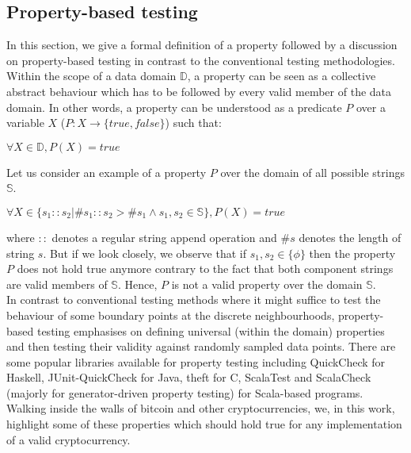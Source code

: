 
\newcommand{\avector}[2]{(#1_1,#1_2,\ldots,#1_{#2})}
\newcommand{\aDEFvector}[2][a]{(#1_1,#1_2,\ldots,#1_{#2})}

\subsection{Property-based testing}
In this section, we give a formal definition of a property followed by a discussion on property-based testing in contrast to the conventional testing methodologies.\\
Within the scope of a data domain $\mathbb{D}$, a property can be seen as a collective abstract behaviour which has to be followed by every valid member of the data domain. In other words, a property can be understood as a predicate $P$ over a variable $X$ ($P:X \rightarrow \{true, false\}$) such that: 
\begin{center}
$\forall X \in \mathbb{D}, P(X) = true$
\end{center}
Let us consider an example of a property $P$ over the domain of all possible strings $\mathbb{S}$.
\begin{center}
$\forall X \in \{s_1::s_2 | \#s_1::s_2 >  \#s_1 \wedge s_1, s_2 \in \mathbb{S}\}, P(X) = true$
\end{center}
where $::$ denotes a regular string append operation and $\#s$ denotes the length of string $s$. But if we look closely, we observe that if $s_1, s_2 \in \{\phi\}$ then the property $P$ does not hold true anymore contrary to the fact that both component strings are valid members of $\mathbb{S}$. Hence, $P$ is not a valid property over the domain $\mathbb{S}$. \\
In contrast to conventional testing methods where it might suffice to test the behaviour of some boundary points at the discrete neighbourhoods, property-based testing emphasises on defining universal (within the domain) properties and then testing their validity against randomly sampled data points. There are some popular libraries available for property testing including QuickCheck for Haskell, JUnit-QuickCheck for Java, theft for C, ScalaTest and ScalaCheck (majorly for generator-driven property testing) for Scala-based programs. 
Walking inside the walls of bitcoin and other cryptocurrencies, we, in this work, highlight some of these properties which should hold true for any implementation of a valid cryptocurrency.